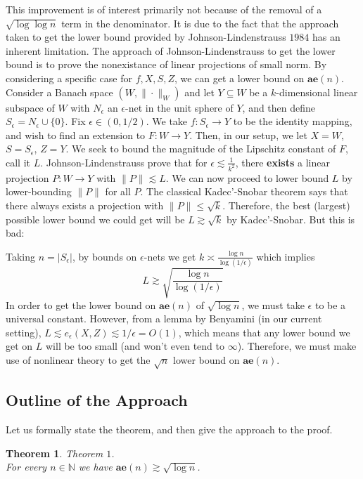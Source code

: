 \documentclass[10pt]{article}
\newtheorem{theorem}{Theorem}[section]
\theoremstyle{definition}
\theoremstyle{definition}
\theoremstyle{definition}
\theoremstyle{definition}
\newcommand{\N}
{\mathbb{N}}
\begin{document}
This improvement is of interest primarily not because of the removal of a $\sqrt{\log \log n}$ term in the denominator.
It is due to the fact that the approach taken to get the lower bound provided by Johnson-Lindenstrauss $1984$ has an inherent limitation. 
The approach of Johnson-Lindenstrauss to get the lower bound is to prove the nonexistance of linear projections of small norm. 
By considering a specific case for $f, X, S, Z$, we can get a lower bound on $\textbf{ae}(n)$.
Consider a Banach space $(W, \|\cdot\|_W)$ and let $Y \subseteq W$ be a $k$-dimensional linear subspace of $W$ with $N_{\epsilon}$ an $\epsilon$-net in the unit sphere of $Y$, and then define $S_{\epsilon} = N_{\epsilon} \cup \{0\}$. Fix $\epsilon \in (0, 1/2)$. 
We take $f: S_{\epsilon} \to Y$ to be the identity mapping, and wish to find an extension to $F:W \to Y$. Then, in our setup, we let $X = W$, $S = S_{\epsilon}$, $Z = Y$. We seek to bound the magnitude of the Lipschitz constant of $F$, call it $L$. Johnson-Lindenstrauss prove that for $\epsilon \lesssim \frac{1}{k^2}$, there \textbf{exists} a linear projection $P:W \to Y$ with $\|P\| \lesssim L$. We can now proceed to lower bound $L$ by lower-bounding $\|P\|$ for all $P$. The classical Kadec'-Snobar theorem says that there always exists a projection with $\|P\| \leq \sqrt{k}$. Therefore, the best (largest) possible lower bound we could get will be $L \gtrsim \sqrt{k}$ by Kadec'-Snobar. But this is bad:

Taking $n = |S_{\epsilon}|$, by bounds on $\epsilon$-nets we get $k \asymp \frac{\log n}{\log(1/\epsilon)}$ which implies
\[
L \gtrsim \sqrt{\frac{\log n}{\log (1/\epsilon)}}
\]
In order to get the lower bound on $\textbf{ae}(n)$ of $\sqrt{\log n}$, we must take $\epsilon$ to be a universal constant.
However, from a lemma by Benyamini (in our current setting), $L \lesssim e_{\epsilon}(X, Z) \lesssim 1/\epsilon = O(1)$, which means that any lower bound we get on $L$ will be too small (and won't even tend to $\infty$). Therefore, we must make use of nonlinear theory to get the $\sqrt{n}$ lower bound on $\textbf{ae}(n)$. 

\subsection{Outline of the Approach}

Let us formally state the theorem, and then give the approach to the proof. 
\begin{theorem} Theorem $1$. \\
For every $n \in \N$ we have $\textbf{ae}(n) \gtrsim \sqrt{\log n}$. 
\end{theorem}
\end{document}
